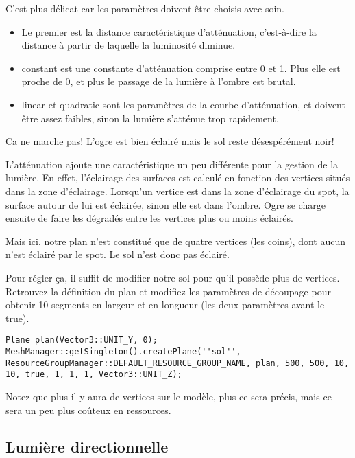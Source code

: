 \documentclass[10pt,a4paper]{report}
\begin{document}
C'est plus d\'elicat car les param\`etres doivent \^etre choisis avec soin. 
\begin{itemize}
\item Le premier est la distance caract\'eristique d'att\'enuation, c'est-\`{a}-dire la distance \`{a} partir de laquelle la luminosit\'e diminue. 
\item constant est une constante d'att\'enuation comprise entre 0 et 1. Plus elle est proche de 0, et plus le passage de la lumi\`ere \`{a} l'ombre est brutal.
\item linear et quadratic sont les param\`etres de la courbe d'att\'enuation, et doivent \^etre assez faibles, sinon la lumi\`ere s'att\'enue trop rapidement.
\end{itemize}
	


Ca ne marche pas! L'ogre est bien \'eclair\'e mais le sol reste d\'esesp\'er\'ement noir!

L'att\'enuation ajoute une caract\'eristique un peu diff\'erente pour la gestion de la lumi\`ere. En effet, l'\'eclairage des surfaces est calcul\'e en fonction des vertices situ\'es dans la zone d'\'eclairage. Lorsqu'un vertice est dans la zone d'\'eclairage du spot, la surface autour de lui est \'eclair\'ee, sinon elle est dans l'ombre. Ogre se charge ensuite de faire les d\'egrad\'es entre les vertices plus ou moins \'eclair\'es.

Mais ici, notre plan n'est constitu\'e que de quatre vertices (les coins), dont aucun n'est \'eclair\'e par le spot. Le sol n'est donc pas \'eclair\'e.

Pour r\'egler \c{c}a, il suffit de modifier notre sol pour qu'il poss\`ede plus de vertices. Retrouvez la d\'efinition du plan et modifiez les param\`etres de d\'ecoupage pour obtenir 10 segments en largeur et en longueur (les deux param\`etres avant le true).

\begin{lstlisting}
Plane plan(Vector3::UNIT_Y, 0);
MeshManager::getSingleton().createPlane(''sol'', ResourceGroupManager::DEFAULT_RESOURCE_GROUP_NAME, plan, 500, 500, 10, 10, true, 1, 1, 1, Vector3::UNIT_Z);
\end{lstlisting}



Notez que plus il y aura de vertices sur le mod\`ele, plus ce sera pr\'ecis, mais ce sera un peu plus co\^uteux en ressources.




\subsection{Lumi\`ere directionnelle}
\end{document}
